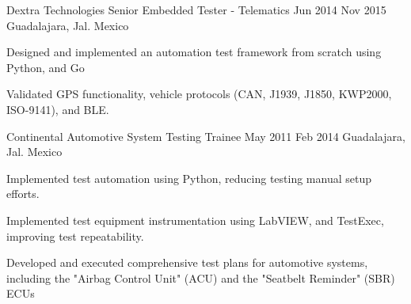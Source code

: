 \job
    {Dextra Technologies}
    {Senior Embedded Tester - Telematics}
    {Jun 2014}
    {Nov 2015}
    {Guadalajara, Jal. Mexico}
    {
        \begin{itemize-bullets}
            \item{Designed and implemented an automation test framework from scratch using Python, and Go}
            \item{Validated GPS functionality, vehicle protocols (CAN, J1939, J1850, KWP2000, ISO-9141), and BLE.}
        \end{itemize-bullets}
    }

\job
    {Continental Automotive}
    {System Testing Trainee}
    {May 2011}
    {Feb 2014}
    {Guadalajara, Jal. Mexico}
    {
        \begin{itemize-bullets}
            \item{Implemented test automation using Python, reducing testing manual setup efforts.}
            \item{Implemented test equipment instrumentation using LabVIEW, and TestExec, improving test repeatability.}
            \item{Developed and executed comprehensive test plans for automotive systems, including the "Airbag Control Unit" (ACU) and the "Seatbelt Reminder" (SBR) ECUs}
        \end{itemize-bullets}
    }

